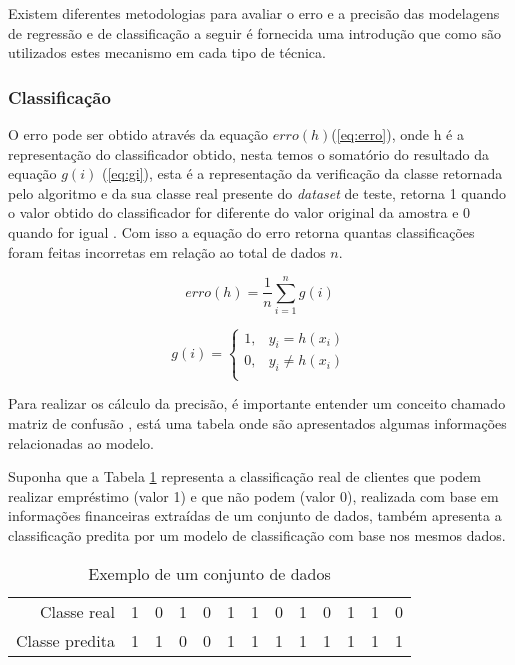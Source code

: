 \documentclass[
12pt,				%
oneside,			%
a4paper,			%
english,			%
french,				%
spanish,			%
brazil				%
]{abntex2}
\begin{document}
Existem diferentes metodologias para avaliar o erro e a precisão das modelagens de regressão e de classificação a seguir é fornecida uma introdução que como são utilizados estes mecanismo em cada tipo de técnica.

\subsubsection{Classificação}

O erro pode ser obtido através da equação $erro(h)$(\ref{eq:erro}), onde h é a representação do classificador obtido, nesta temos o somatório do resultado da equação $g(i)$ (\ref{eq:gi}), esta é a representação da verificação da classe retornada pelo algoritmo e da sua classe real presente do \textit{dataset} de teste, retorna 1 quando o valor obtido do classificador for diferente do valor original da amostra e 0 quando for igual \cite{sammut2011encyclopedia}. Com isso a equação do erro retorna quantas classificações foram feitas incorretas em relação ao total de dados $n$. 

\begin{equation}
erro(h) = \frac{1}{n}\sum_{i=1}^{n}g(i) 
\label{eq:erro}
\end{equation} 

\begin{equation}
	g(i) = 
	\left \{
	\begin{array}{cc}
	1, & y_{i} = h(x_{i}) \\
	0, & y_{i} \neq h(x_{i}) \\
	\end{array}
	\right.
\label{eq:gi}
\end{equation}


Para realizar os cálculo da precisão, é importante entender um conceito chamado matriz de confusão \cite{sammut2011encyclopedia}, está uma tabela onde são apresentados algumas informações relacionadas ao modelo. 

Suponha que a Tabela \ref{tab:exemplopred} representa a classificação real de clientes que podem realizar empréstimo (valor 1) e que não podem (valor 0), realizada com base em informações financeiras extraídas de um conjunto de dados, também apresenta a classificação predita por um modelo de classificação com base nos mesmos dados. 

\begin{table}[h]
	\centering
	\caption{Exemplo de um conjunto de dados}
	\begin{tabular}{r|rrrrrrrrrrrr}
		
		Classe real & 1 & 0 & 1 & 0 & 1 &1&0&1&0&1&1&0\\
		Classe predita & 1 & 1 & 0 & 0 & 1 &1&1&1&1&1&1&1 
		
		
	\end{tabular}
	\label{tab:exemplopred}
\end{table}
\end{document}
